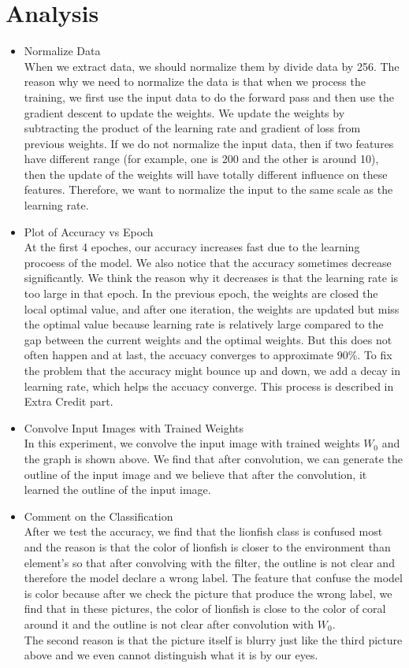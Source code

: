 \documentclass[12pt]{article}
\begin{document}
	\section{Analysis}
	\begin{itemize}
		\item Normalize Data\\
		When we extract data, we should normalize them by divide data by 256. The reason why we need to normalize the data is that when we process the training, we first use the input data to do the forward pass and then use the gradient descent to update the weights. We update the weights by subtracting the product of the learning rate and gradient of loss from previous weights. If we do not normalize the input data, then if two features have different range (for example, one is 200 and the other is around 10), then the update of the weights will have totally different influence on these features. Therefore, we want to normalize the input to the same scale as the learning rate.
		\item Plot of Accuracy vs Epoch \\
		At the first 4 epoches, our accuracy increases fast due to the learning procoess of the model. We also notice that the accuracy sometimes decrease significantly. We think the reason why it decreases is that the learning rate is too large in that epoch. In the previous epoch, the weights are closed the local optimal value, and after one iteration, the weights are updated but miss the optimal value because learning rate is relatively large compared to the gap between the current weights and the optimal weights. But this does not often happen and at last, the accuacy converges to approximate 90\%. To fix the problem that the accuracy might bounce up and down, we add a decay in learning rate, which helps the accuacy converge. This process is described in Extra Credit part.
		\item Convolve Input Images with Trained Weights \\
		In this experiment, we convolve the input image with trained weights $W_0$ and the graph is shown above. We find that after convolution, we can generate the outline of the input image and we believe that after the convolution, it learned the outline of the input image.
		\item Comment on the Classification \\
		After we test the accuracy, we find that the lionfish class is confused most and the reason is that the color of lionfish is closer to the environment than element’s so that after convolving with the filter, the outline is not clear and therefore the model declare a wrong label. The feature that confuse the model is color because after we check the picture that produce the wrong label, we find that in these pictures, the color of lionfish is close to the color of coral around it and the outline is not clear after convolution with $W_0$. \\
		The second reason is that the picture itself is blurry just like the third picture above and we even cannot distinguish what it is by our eyes.

	\end{itemize}
\end{document}
